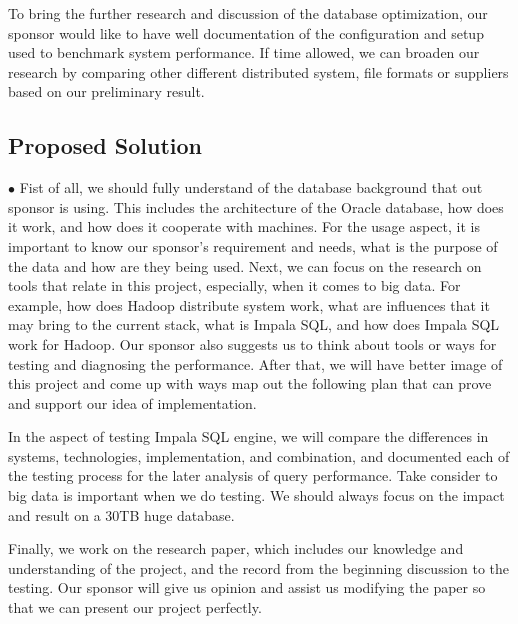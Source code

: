\documentclass[letterpaper,10pt,fleqn,draftclsnofoot,onecolumn]{IEEEtran}
\begin{document}
To bring the further research and discussion of the database optimization, our sponsor would like to have well documentation of the configuration and setup used to benchmark system performance. If time allowed, we can broaden our research by comparing other different distributed system, file formats or suppliers based on our preliminary result. 


	
	
	\subsection{Proposed Solution}
	$\bullet$ Fist of all, we should fully understand of the database background that out sponsor is using. This includes the architecture of the Oracle database, how does it work, and how does it cooperate with machines. For the usage aspect, it is important to know our sponsor’s requirement and needs, what is the purpose of the data and how are they being used. Next, we can focus on the research on tools that relate in this project, especially, when it comes to big data. For example, how does Hadoop distribute system work, what are influences that it may bring to the current stack, what is Impala SQL, and how does Impala SQL work for Hadoop. Our sponsor also suggests us to think about tools or ways for testing and diagnosing the performance. After that, we will have better image of this project and come up with ways map out the following plan that can prove and support our idea of implementation. 

In the aspect of testing Impala SQL engine, we will compare the differences in systems, technologies, implementation, and combination, and documented each of the testing process for the later analysis of query performance. Take consider to big data is important when we do testing. We should always focus on the impact and result on a 30TB huge database.  

Finally, we work on the research paper, which includes our knowledge and understanding of the project, and the record from the beginning discussion to the testing. Our sponsor will give us opinion and assist us modifying the paper so that we can present our project perfectly.   
                  

	
\end{document}
